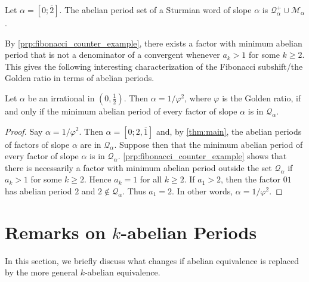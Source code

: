 \documentclass[a4paper,fleqn]{article}
\newcommand{\qk}[1]{\mathcal{Q}_{#1}}
\newcommand{\qkl}[1]{\mathcal{Q}^+_{#1}}
\begin{document}
  \begin{conjecture}
    Let $\alpha = [0; \overline{2}]$. The abelian period set of a Sturmian word of slope $\alpha$ is
    $\qkl{\alpha} \cup \mathcal{M}_\alpha$.
  \end{conjecture}

  By \autoref{prp:fibonacci_counter_example}, there exists a factor with minimum abelian period that is not a
  denominator of a convergent whenever $a_k > 1$ for some $k \geq 2$. This gives the following interesting
  characterization of the Fibonacci subshift/the Golden ratio in terms of abelian periods.

  \begin{theorem}\label{thm:fibonacci_characterization}
    Let $\alpha$ be an irrational in $(0, \tfrac12)$. Then $\alpha = 1/\varphi^2$, where $\varphi$ is the Golden ratio,
    if and only if the minimum abelian period of every factor of slope $\alpha$ is in $\qk{\alpha}$.
  \end{theorem}
  \begin{proof}
    Say $\alpha = 1/\varphi^2$. Then $\alpha = [0; 2, \overline{1}]$ and, by \autoref{thm:main}, the abelian periods of
    factors of slope $\alpha$ are in $\qk{\alpha}$. Suppose then that the minimum abelian period of every factor of
    slope $\alpha$ is in $\qk{\alpha}$. \autoref{prp:fibonacci_counter_example} shows that there is necessarily a
    factor with minimum abelian period outside the set $\qk{\alpha}$ if $a_k > 1$ for some $k \geq 2$. Hence $a_k = 1$
    for all $k \geq 2$. If $a_1 > 2$, then the factor $01$ has abelian period $2$ and $2 \notin \qk{\alpha}$. Thus
    $a_1 = 2$. In other words, $\alpha = 1/\varphi^2$.
  \end{proof}

  \section{Remarks on \texorpdfstring{$k$}{k}-abelian Periods}\label{sec:k-abelian}
  In this section, we briefly discuss what changes if abelian equivalence is replaced by the more general $k$-abelian
  equivalence.
\end{document}
